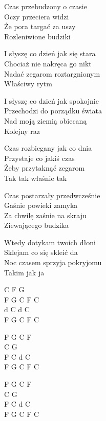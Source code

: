 \begin{text}    
    Czas przebudzony o czasie\\   
    Oczy przeciera widzi \\   
    Że pora targać za uszy\\           
    Rozleniwione budziki
	
    \vin I słyszę co dzień jak się stara\\  
    \vin Chociaż nie nakręca go nikt\\      
    \vin Nadać zegarom roztargnionym\\     
    \vin Właściwy rytm          
          
    \vin I słyszę co dzień jak spokojnie\\
    \vin Przechodzi do porządku świata\\
    \vin Nad moją ziemią obiecaną\\
    \vin Kolejny raz

    Czas rozbiegany jak co dnia\\
    Przystaje co jakiś czas\\
    Żeby przytaknąć zegarom\\
    Tak tak właśnie tak
	
    Czas postarzały przedwcześnie\\
    Gaśnie powieki zamyka\\
    Za chwilę zaśnie na skraju\\
    Ziewającego budzika	
	

    \vin Wtedy dotykam twoich dłoni\\
    \vin Sklejam co się skleić da\\
    \vin Noc czasem sprzyja pokryjomu\\
    \vin Takim jak ja
	
\end{text}
\begin{chord}
    C F G\\
    F G C F C\\
    d C d C\\
    F G C F C
	
    F G C F\\
    C G\\
    F C d C\\
    F G C F C

    F G C F\\
    C G\\
    F C d C\\
    F G C F C
\end{chord}